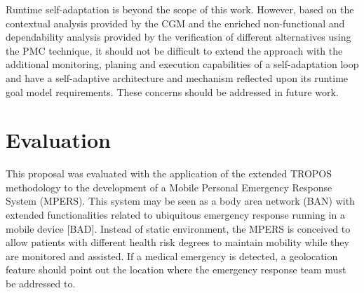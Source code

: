 
Runtime self-adaptation is beyond the scope of this work. However, based on the contextual analysis provided by the CGM and the enriched non-functional and dependability analysis provided by the verification of different alternatives using the PMC technique, it should not be difficult to extend the approach with the additional monitoring, planing and execution capabilities of a self-adaptation loop and have a self-adaptive architecture and mechanism reflected upon its runtime goal model requirements. These concerns should be addressed in future work.




\section{Evaluation}

This proposal was evaluated with the application of the extended TROPOS methodology to the development of a Mobile Personal Emergency Response System (MPERS). This system may be seen as a body area network (BAN) with extended functionalities related to ubiquitous emergency response running in a mobile device [BAD]. Instead of static environment, the MPERS is conceived to allow patients with different health risk degrees to maintain mobility while they are monitored and assisted. If a medical emergency is detected, a geolocation feature should point out the location where the emergency response team must be addressed to. 

